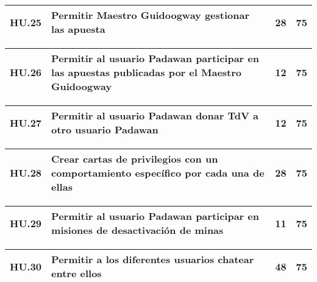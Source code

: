 \begin{table}[h]
	\centering
	\begin{tabular}{| p{2.3cm} | p{5.1cm} | p{2cm} | p{1.6cm} |}
		\hline 
		HU.25 & Permitir Maestro Guidoogway gestionar las apuesta & 28 & 75 \\ \hline 
	\end{tabular}
\end{table}

\begin{table}[h]
	\centering
	\begin{tabular}{| p{2.3cm} | p{5.1cm} | p{2cm} | p{1.6cm} |}
		\hline 
		HU.26 & Permitir al usuario Padawan participar en las apuestas publicadas por el Maestro Guidoogway & 12 & 75 \\ \hline 
	\end{tabular}
\end{table}

\begin{table}[h]
	\centering
	\begin{tabular}{| p{2.3cm} | p{5.1cm} | p{2cm} | p{1.6cm} |}
		\hline 
		HU.27 & Permitir al usuario Padawan donar TdV a otro usuario Padawan & 12 & 75 \\ \hline 
	\end{tabular}
\end{table}

\begin{table}[h]
	\centering
	\begin{tabular}{| p{2.3cm} | p{5.1cm} | p{2cm} | p{1.6cm} |}
		\hline 
		HU.28 & Crear cartas de privilegios con un comportamiento específico por cada una de ellas & 28 & 75 \\ \hline 
	\end{tabular}
\end{table}

\begin{table}[h]
	\centering
	\begin{tabular}{| p{2.3cm} | p{5.1cm} | p{2cm} | p{1.6cm} |}
		\hline 
		HU.29 & Permitir al usuario Padawan participar en misiones de desactivación de minas & 11 & 75 \\ \hline 
	\end{tabular}
\end{table}

\begin{table}[h]
	\centering
	\begin{tabular}{| p{2.3cm} | p{5.1cm} | p{2cm} | p{1.6cm} |}
		\hline 
		HU.30 & Permitir a los diferentes usuarios chatear entre ellos & 48 & 75 \\ \hline 
	\end{tabular}
\end{table}

